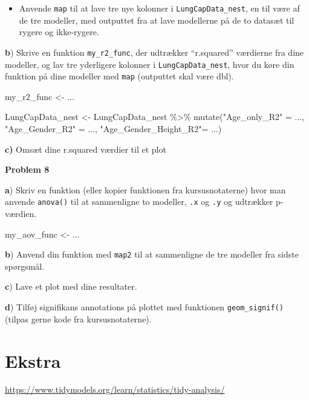 \documentclass[
]{book}
\newenvironment{Shaded}{\begin{snugshade}}{\end{snugshade}}
\newcommand{\FunctionTok}[1]{\textcolor[rgb]{0.00,0.00,0.00}{#1}}
\newcommand{\NormalTok}[1]{#1}
\newcommand{\OtherTok}[1]{\textcolor[rgb]{0.56,0.35,0.01}{#1}}
\newcommand{\SpecialCharTok}[1]{\textcolor[rgb]{0.00,0.00,0.00}{#1}}
\newcommand{\StringTok}[1]{\textcolor[rgb]{0.31,0.60,0.02}{#1}}
\providecommand{\tightlist}{%
  \setlength{\itemsep}{0pt}\setlength{\parskip}{0pt}}
\begin{document}
\begin{itemize}
\tightlist
\item
  Anvende \texttt{map} til at lave tre nye kolonner i \texttt{LungCapData\_nest}, en til være af de tre modeller, med outputtet fra at lave modellerne på de to datasæt til rygere og ikke-rygere.
\end{itemize}

\textbf{b}) Skrive en funktion \texttt{my\_r2\_func}, der udtrækker ``r.squared'' værdierne fra dine modeller, og lav tre yderligere kolonner i \texttt{LungCapData\_nest}, hvor du køre din funktion på dine modeller med \texttt{map} (outputtet skal være dbl).

\begin{Shaded}
\begin{Highlighting}[]
\NormalTok{my\_r2\_func }\OtherTok{\textless{}{-}}\NormalTok{ ...}
\end{Highlighting}
\end{Shaded}

\begin{Shaded}
\begin{Highlighting}[]
\NormalTok{LungCapData\_nest }\OtherTok{\textless{}{-}}\NormalTok{ LungCapData\_nest }\SpecialCharTok{\%\textgreater{}\%}
  \FunctionTok{mutate}\NormalTok{(}\StringTok{"Age\_only\_R2"} \OtherTok{=}\NormalTok{ ...,}
         \StringTok{"Age\_Gender\_R2"} \OtherTok{=}\NormalTok{ ...,}
         \StringTok{"Age\_Gender\_Height\_R2"}\OtherTok{=}\NormalTok{ ...)}
\end{Highlighting}
\end{Shaded}

\textbf{c)} Omsæt dine r.squared værdier til et plot

\textbf{Problem 8}

\textbf{a}) Skriv en funktion (eller kopier funktionen fra kursusnotaterne) hvor man anvende \texttt{anova()} til at sammenligne to modeller, \texttt{.x} og \texttt{.y} og udtrækker p-værdien.

\begin{Shaded}
\begin{Highlighting}[]
\NormalTok{my\_aov\_func }\OtherTok{\textless{}{-}}\NormalTok{ ...}
\end{Highlighting}
\end{Shaded}

\textbf{b}) Anvend din funktion med \texttt{map2} til at sammenligne de tre modeller fra sidste spørgsmål.

\textbf{c}) Lave et plot med dine resultater.

\textbf{d}) Tilføj signifikans annotations på plottet med funktionen \texttt{geom\_signif()} (tilpas gerne kode fra kursusnotaterne).

\hypertarget{ekstra}{%
\section{Ekstra}\label{ekstra}}

\url{https://www.tidymodels.org/learn/statistics/tidy-analysis/}

  
\end{document}
